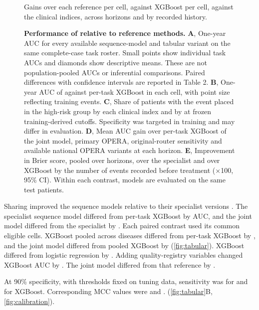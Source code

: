 \begin{figure}[H]
    {Gains over each reference per cell, against XGBoost per cell, against the
    clinical indices, across horizons and by recorded history.}
  \caption{\textbf{Performance of \opera{} relative to reference
  methods.} \textbf{A}, One-year AUC for every available sequence-model and
  tabular variant on the same complete-case task roster. Small points show
  individual task AUCs and diamonds show descriptive means. These are not
  population-pooled AUCs or inferential comparisons. Paired differences with
  confidence intervals are reported in Table 2. \textbf{B}, One-year AUC of \opera{}
  against per-task XGBoost in each cell, with point size reflecting training events.
  \textbf{C}, Share of patients with the event placed in the high-risk group by
  each clinical index and by \opera{} at frozen training-derived cutoffs.
  Specificity was targeted in training and may differ in evaluation. \textbf{D}, Mean AUC gain over per-task XGBoost of
  the joint model, primary OPERA, original-router sensitivity and available
  national OPERA variants at each horizon. \textbf{E}, Improvement in Brier
  score, pooled over horizons, over the specialist and over XGBoost by the number
  of events recorded before treatment ($\times$100, 95\% CI). Within each contrast, models are evaluated on the same test patients.}
  \label{fig:headline}
\end{figure}

Sharing improved the sequence models relative to their specialist versions
. The specialist sequence model differed
from per-task XGBoost by  AUC, and the joint model differed
from the specialist by . Each paired contrast used its common eligible cells.
 XGBoost pooled across diseases differed from per-task XGBoost
by , and the joint model differed from pooled XGBoost by
 (\cref{fig:tabular}). XGBoost differed from logistic
regression by . Adding quality-registry variables changed
XGBoost AUC by . The joint model differed from that reference
by .

At 90\% specificity, with thresholds fixed on tuning data, sensitivity was
 for \opera{} and  for
XGBoost. Corresponding MCC values were  and
.  (\cref{fig:tabular}B,
\cref{fig:calibration}).

